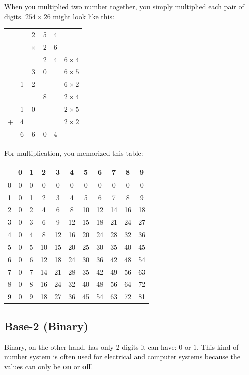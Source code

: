 When you multiplied two number together, you simply multiplied each
pair of digits. $254 \times 26$ might look like this:

\begin{tabular} {r c c c c | c}
 & & 2 & 5 & 4 & \\
 & & $\times$ & 2 & 6 & \\
 \hline
& &  & 2 & 4 & $6 \times 4$\\
& & 3 & 0 & & $6 \times 5$ \\
& 1 & 2 & & & $6 \times 2$ \\
& & & 8 & & $2 \times 4$ \\
& 1 & 0 & & & $2 \times 5$\\
+ & 4 & & & & $2 \times 2$\\
 \hline
 & 6 & 6 & 0 & 4 &
 \end{tabular}
 

For multiplication, you memorized this table:

\begin{tabular}{ c || c | c | c | c | c | c| c| c| c| c}
 & 0 & 1 & 2 & 3 & 4 & 5 & 6 & 7 & 8 & 9 \\
 \hline
 0 & 0 & 0 & 0 & 0 & 0 & 0 & 0 & 0 & 0 & 0 \\
 1 & 0 & 1 & 2 & 3 & 4 & 5 & 6 & 7 & 8 & 9 \\
 2 & 0 & 2 & 4 & 6 & 8 & 10 & 12 & 14 & 16 & 18 \\
 3 & 0 & 3 & 6 & 9 & 12 & 15 & 18 & 21 & 24 & 27 \\
 4 & 0 & 4 & 8 & 12 & 16 & 20 & 24 & 28 & 32 & 36 \\
 5 & 0 & 5 & 10 & 15 & 20 & 25 & 30 & 35 & 40 & 45 \\
 6 & 0 & 6 & 12 & 18 & 24 & 30 & 36 & 42 & 48 & 54 \\
 7 & 0 & 7 & 14 & 21 & 28 & 35 & 42 & 49 & 56 & 63 \\
 8 & 0 & 8 & 16 & 24 & 32 & 40 & 48 & 56 & 64 & 72 \\
 9 & 0 & 9 & 18 & 27 & 36 & 45 & 54 & 63 & 72 & 81 
 \end{tabular}

\subsection{Base-2 (Binary)}
Binary, on the other hand, has only 2 digits it can have: $0$ or $1$. 
This kind of number system is often used for electrical and computer systems because the values can only be \textbf{on} or \textbf{off}.

